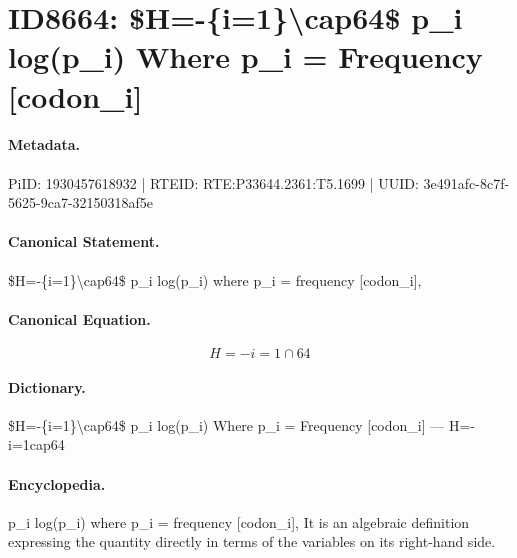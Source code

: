 \section*{ID8664: \$H=-\{i=1\}\textbackslash{}cap64\$ p\_i log(p\_i) Where p\_i = Frequency [codon\_i]}
\paragraph{Metadata.}
PiID: 1930457618932 | RTEID: RTE:P33644.2361:T5.1699 | UUID: 3e491afc-8c7f-5625-9ca7-32150318af5e

\paragraph{Canonical Statement.}
\$H=-\{i=1\}\textbackslash{}cap64\$ p\_i log(p\_i) where p\_i = frequency [codon\_i],

\paragraph{Canonical Equation.}
\[
H=-{i=1}\cap64
\]

\paragraph{Dictionary.}
\$H=-\{i=1\}\textbackslash{}cap64\$ p\_i log(p\_i) Where p\_i = Frequency [codon\_i] — H=-i=1cap64

\paragraph{Encyclopedia.}
p\_i log(p\_i) where p\_i = frequency [codon\_i], It is an algebraic definition expressing the quantity directly in terms of the variables on its right-hand side.
